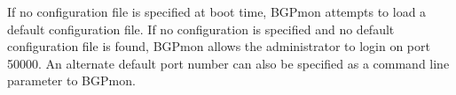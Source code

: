 If no configuration file is specified at boot time,  BGPmon attempts to load a default configuration file.    If no configuration is specified and no default configuration file is found,  BGPmon allows the administrator to login on port 50000.   An alternate default port number can also be specified as a command line parameter to BGPmon.

%
